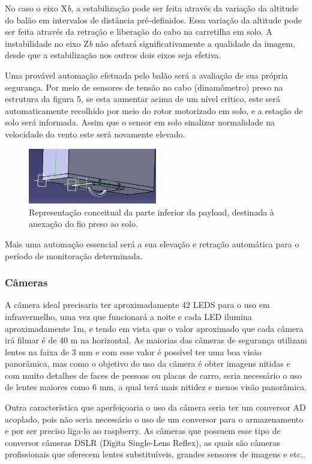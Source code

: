 	No caso o eixo X\textit{b}, a estabilização pode ser feita através da variação da altitude do balão em intervalos de distância pré-definidos. Essa variação da altitude pode ser feita através da retração e liberação do cabo na carretilha em solo. A instabilidade no eixo Z\textit{b} não afetará significativamente a qualidade da imagem, desde que a estabilização nos outros dois eixos seja efetiva.

	Uma provável automação efetuada pelo balão será a avaliação de sua própria segurança. Por meio de sensores de tensão no cabo (dinamômetro) preso na estrutura da figura 5, se esta aumentar acima de um nível critico, este será automaticamente recolhido por meio do rotor motorizado em solo, e a estação de solo será informada. Assim que o sensor em solo sinalizar normalidade na velocidade do vento este será novamente elevado.

	\begin{figure}[H]
		\centering
		\includegraphics[width=0.5\textwidth]{figuras/parteInferior}
		\caption{Representação conceitual da parte inferior da payload, destinada à anexação do fio preso ao solo.}
		\label{img:parteInferior}
	\end{figure}

	Mais uma automação essencial será a sua elevação e retração automática para o período de monitoração determinada.

\subsubsection{Câmeras}
	A câmera ideal precisaria ter aproximadamente 42 LEDS para o uso em infravermelho, uma vez que funcionará a noite e cada LED ilumina aproximadamente 1m, e tendo em vista que o valor aproximado que cada câmera irá filmar é de 40 m na horizontal. As maiorias das câmeras de segurança utilizam lentes na faixa de 3 mm e com esse valor é possível ter uma boa visão panorâmica, mas como o objetivo do uso da câmera é obter imagens nítidas e com  muito detalhes de faces de pessoas ou placas de carro, seria necessário o uso de lentes maiores como 6 mm, a qual terá mais nitidez e menos visão panorâmica.

	Outra característica que aperfeiçoaria o uso da câmera seria ter um conversor AD acoplado, pois não seria necessário o uso de um conversor para o armazenamento e por ser preciso liga-lo ao raspberry. As câmeras que possuem esse tipo de conversor câmeras DSLR (Digita Single-Lens Reflex), as quais são câmeras profissionais que oferecem lentes substituíveis, grandes sensores de imagens e etc..

